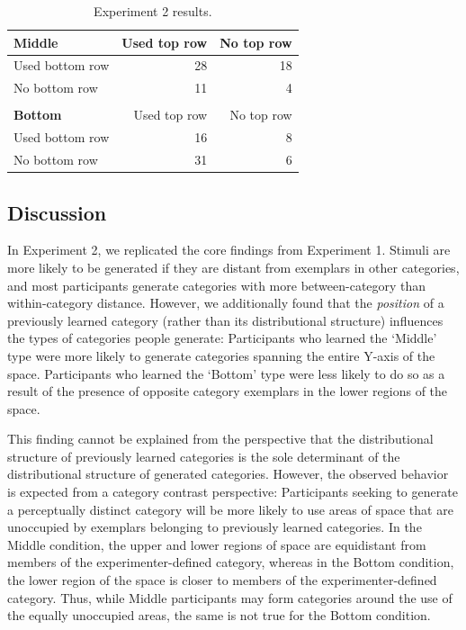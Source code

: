 \documentclass[pdflatex,sn-apa]{sn-jnl}%
\theoremstyle{thmstyleone}%
\theoremstyle{thmstyletwo}%
\theoremstyle{thmstylethree}%
\begin{document}
\begin{table}
\begin{center}
\caption{Experiment 2 results.}
\label{table:e2-subset-table} \vskip 0.12in
\begin{tabular}{ l r r} \textbf{Middle} & Used top row & No top row \\ \hline
Used bottom row & 28 & 18 \\ No bottom row & 11 & 4 \\ \\ \textbf{Bottom} & Used
top row & No top row \\ \hline Used bottom row & 16 & 8 \\ No bottom row & 31 &
6 \\
\end{tabular}
\end{center}
\end{table}

\subsection{Discussion}

In Experiment 2, we replicated the core findings from Experiment 1. Stimuli are
more likely to be generated if they are distant from exemplars in other
categories, and most participants generate categories with more between-category
than within-category distance. However, we additionally found that the {\em
position} of a previously learned category (rather than its distributional
structure) influences the types of categories people generate: Participants who
learned the `Middle' type were more likely to generate categories spanning the
entire Y-axis of the space. Participants who learned the `Bottom' type were less
likely to do so as a result of the presence of opposite category exemplars in
the lower regions of the space.

This finding cannot be explained from the perspective that the distributional
structure of previously learned categories is the sole determinant of the
distributional structure of generated categories. However, the observed behavior
is expected from a category contrast perspective: Participants seeking to
generate a perceptually distinct category will be more likely to use areas of
space that are unoccupied by exemplars belonging to previously learned
categories. In the Middle condition, the upper and lower regions of space are
equidistant from members of the experimenter-defined category, whereas in the
Bottom condition, the lower region of the space is closer to members of the
experimenter-defined category. Thus, while Middle participants may form
categories around the use of the equally unoccupied areas, the same is not true
for the Bottom condition.
\end{document}
